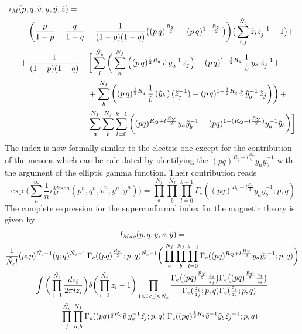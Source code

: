 \begin{equation}
\begin{aligned}
 i_M &(p,q, \tilde v, y,\tilde y ,\tilde z) = \\
& -\bigg({p \over 1-p}+{q \over 1-q} -{1 \over (1-p)(1-q)} \big((p\,q)^{\frac{R_Y}{2}}- (p\,q)^{1-\frac{R_Y}{2}}\big)
\bigg) \big( \sum_{i,j}^{\tilde N_c} \tilde z_i \tilde z_j^{-1} -1\big ) + \\
&
\begin{aligned}
& +{1\over (1-p)(1-q)} && \bigg[ \sum_j^{\tilde N_c} \bigg( \sum_a^{N_f}\left(  (p\,q)^{{1 \over 2 } R_q} \,\tilde v \, y_a^{-1}\, \tilde z_j\right) 
-  (p\,q)^{1- {1\over 2}R_q} \, {1 \over \tilde v}\, y_a\,
\tilde z_j^{-1} + \\
&  &&+ \sum_b^{N_f} \left( (p\,q)^{{1 \over 2 } R_q}\, {1\over \tilde v}\,
({\tilde y_b}\,) \,
(\tilde z_j^{-1})
- (p\,q)^{1-  {1\over 2}R_q} \, \tilde v \,
{\tilde y_b}^{-1} \,
\tilde z_j \bigg) \right) + \\
 & &&\sum_a^{N_f} \sum_b^{N_f} \sum_{l=0}^{k-1}   \bigg(  (pq)^{ R_Q + l \frac{R_Y}{2}   } y_a \tilde y_b^{-1}   - (pq)^{1 -( R_Q + l \frac{R_Y}{2}  )}
y_a^{-1}  {\tilde y_b}  \bigg) \bigg] 
\end{aligned}
\end{aligned}
\end{equation}
The index is now formally similar to the electric one except for the contribution of the mesons which can be calculated by identifying the $(pq)^{R_q + l \frac{R_Y}{2}} y_a \tilde{y}_b^{-1}$ with the argument of the elliptic gamma function.
Their contribution reads
\begin{equation}
 \exp \bigg( \sum_{n}^{\infty} \frac{1}{n} i_M^{Meson} (p^n,q^n, \tilde v^n, y^n,\tilde {y}^n) \bigg) = 
\prod_a^{N_f} \prod_b^{N_f}  \prod_{l=0}^{k-1} \Gamma_e ( (pq)^{R_q + l \frac{R_Y}{2}} y_a \tilde{y}_b^{-1} ; p ,q)
\end{equation}
The complete expression for the superconformal index for the magnetic theory is given by
\begin{multline}
I_{Mag} ( p,q,y,\tilde v,\tilde y) = \\
 { 1 \over \tilde{N_c} !} (p;p)^{\tilde{N_c}-1} ( q;q)^{\tilde{N_c}-1} \, 
 \Gamma_e( (pq)^\frac{R_Y}{2};p,q)^{\tilde{N_c}-1} \bigg( \prod_a^{N_f} \prod_b^{N_f}  \prod_{l=0}^{k-1} \Gamma_e ( (pq)^{R_Q + l \frac{R_Y}{2}} y_a \tilde{y_b}^{-1}; p ,q) \bigg) \\
\int \bigg( \prod_{i=1}^{ \tilde{N_c }} { d z_i \over { 2 \pi i z_i} } \bigg) \delta \bigg( \prod_{i=1}^{\tilde{N_c}} z_i - 1 \bigg)
\prod_{ 1 \leq i < j \leq \tilde{N_c}} \frac{ \Gamma_e \big( (pq)^\frac{R_Y}{2} {z_i \over z_j} \big) \Gamma_e \big( (pq)^\frac{R_Y}{2} {z_j \over z_i} \big) }{ \Gamma_e( {z_i \over z_j};p,q) \Gamma_e({z_j \over z_i}; p,q)} \\
	\qquad \prod_{ j}^{\tilde{N_c}} \prod_{ a,b}^{N_f} \Gamma_e ( (pq)^{{1 \over 2 } R_q} \tilde{v}\,  y_a^{-1} \tilde{z_j} ; p,q)
\; \Gamma_e ( (pq)^{{1 \over 2 } R_q} \tilde{v}^{-1} \tilde {y}_b \tilde{z_j}^{-1} ; p,q)
\end{multline}

